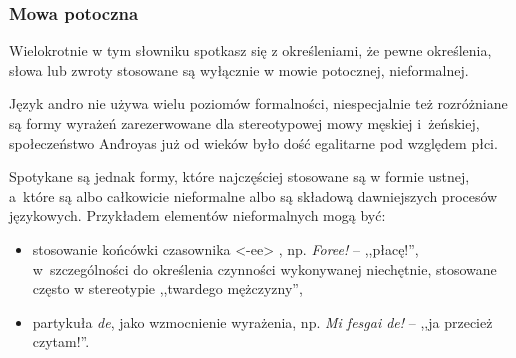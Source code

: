 \begin{spacing}{1.1}
\subsubsection{Mowa potoczna}

Wielokrotnie w tym słowniku spotkasz się z określeniami, że pewne określenia,
słowa lub zwroty stosowane są wyłącznie w mowie potocznej, nieformalnej.

Język andro nie używa wielu poziomów formalności, niespecjalnie też rozróżniane
są formy wyrażeń zarezerwowane dla stereotypowej mowy męskiej i~żeńskiej,
społeczeństwo And́royas już od wieków było dość egalitarne pod względem płci.

Spotykane są jednak formy, które najczęściej stosowane są w formie ustnej,
a~które są albo całkowicie nieformalne albo są składową dawniejszych procesów
językowych. Przykładem elementów nieformalnych mogą być:

\begin{itemize}
	\item stosowanie końcówki czasownika <-ee> , np. \emph{Foree!}
	 -- ,,płacę!'', w~szczególności do określenia czynności
	wykonywanej niechętnie, stosowane często w stereotypie ,,twardego
	mężczyzny'',
	\item partykuła \emph{de}, jako wzmocnienie wyrażenia, np. \emph{Mi fesgai
	de!} -- ,,ja przecież czytam!''.
\end{itemize}

\end{spacing}